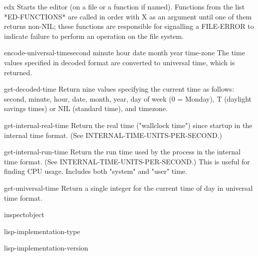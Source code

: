 \begin{function}{ed}{\op x}{}{}
  Starts the editor (on a file or a function if named).  Functions
from the list *ED-FUNCTIONS* are called in order with X as an argument
until one of them returns non-NIL; these functions are responsible for
signalling a FILE-ERROR to indicate failure to perform an operation on
the file system.
\end{function}

\begin{function}{encode-universal-time}{second minute hour date month year \op time-zone}{}{}
  The time values specified in decoded format are converted to
   universal time, which is returned.
\end{function}

\begin{function}{get-decoded-time}{}{}{}
  Return nine values specifying the current time as follows:
   second, minute, hour, date, month, year, day of week (0 = Monday), T
   (daylight savings times) or NIL (standard time), and timezone.
\end{function}

\begin{function}{get-internal-real-time}{}{}{}
  Return the real time ("wallclock time") since startup in the internal
time format. (See INTERNAL-TIME-UNITS-PER-SECOND.)
\end{function}

\begin{function}{get-internal-run-time}{}{}{}
  Return the run time used by the process in the internal time format. (See
INTERNAL-TIME-UNITS-PER-SECOND.) This is useful for finding CPU usage.
Includes both "system" and "user" time.
\end{function}

\begin{function}{get-universal-time}{}{}{}
  Return a single integer for the current time of day in universal time
format.
\end{function}

\begin{function}{inspect}{object}{}{}
  
\end{function}

\begin{function}{lisp-implementation-type}{}{}{}
  
\end{function}

\begin{function}{lisp-implementation-version}{}{}{}
  
\end{function}

